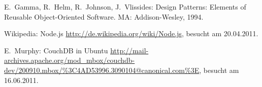 \begin{thebibliography}{99}

  E.\ Gamma, R.\ Helm, R.\ Johnson, J.\ Vlissides:
    Design Patterns: Elements of Reusable Object-Oriented Software.
	MA: Addison-Wesley, 1994.


\hspace{-\leftmargin}{\Large\bfseries Web-Referenzen} %

  Wikipedia: Node.js
    \url{http://de.wikipedia.org/wiki/Node.js}, besucht am 20.04.2011.

	E.\ Murphy:
	CouchDB in Ubuntu
	\url{http://mail-archives.apache.org/mod_mbox/couchdb-dev/200910.mbox/%3C4AD53996.3090104@canonical.com%3E}, besucht am 16.06.2011.

\end{thebibliography}
